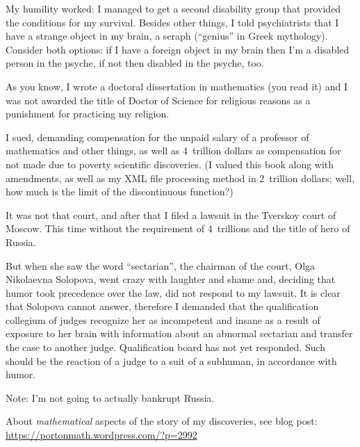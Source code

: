 My humility worked: I managed to get a second disability
group that provided the conditions for my survival. Besides
other things, I told psychiatrists that I have a strange object in my brain, a seraph (``genius'' in Greek mythology). Consider both
options: if I have a foreign object in my brain then I'm a disabled person
in the psyche, if not then disabled in the psyche, too.

As you know, I wrote a doctoral dissertation in mathematics (you read it) and I was not awarded the title of Doctor of Science for religious reasons as a punishment for practicing my religion.

I sued, demanding compensation for the unpaid salary of a professor of mathematics and other things, as well as 4~trillion dollars as compensation for not made due to poverty scientific discoveries. (I valued this book along with amendments, as well as my XML file processing method in 2~trillion dollars; well, how much is the limit of the discontinuous function?)

It was not that court, and after that I filed a lawsuit in the Tverskoy court of Moscow. This time without the requirement of 4~trillions and the title of hero of Russia.

But when she saw the word ``sectarian'', the chairman of the court, Olga Nikolaevna Solopova, went crazy with laughter and shame and, deciding that humor took precedence over the law, did not respond to my lawsuit. It is clear that Solopova cannot answer, therefore I demanded that the qualification collegium of judges recognize her as incompetent and insane as a result of exposure to her brain with information about an abnormal sectarian and transfer the case to another judge. Qualification board has not yet responded. Such should be the reaction of a judge to a suit of a subhuman, in accordance with humor.

Note: I'm not going to actually bankrupt Russia.

About \emph{mathematical} aspects of the story of my discoveries, see blog post:\\
\url{https://portonmath.wordpress.com/?p=2992}
